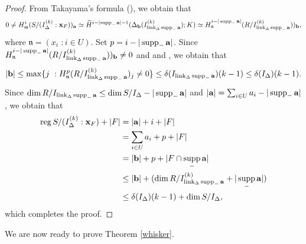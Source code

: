 \documentclass[12pt]{amsart}
\theoremstyle{definition}
\theoremstyle{remark}
\DeclareMathOperator{\link}{link}
\DeclareMathOperator{\supp}{supp}
\DeclareMathOperator{\reg}{reg}
\begin{document}
\begin{proof}
From Takayama's formula (\cite[Theorem 1]{t2005}), we obtain that 
$$0\neq H_{\mathfrak{m}}^{i}(S/(I_{\Delta}^{(k)}:{\bf x}_{F}))_{\bf a}\simeq\widetilde{H}^{i-|{\supp_{-}{\bf a}}|-1}(\Delta_{\bf b}(I_{\link_{\Delta}\supp_{-}{\bf a}}^{(k)});K)\simeq H_{\mathfrak{n}}^{i-|\supp_{-}{\bf a|}}(R/I_{\link_{\Delta}\supp_{-}{\bf a}}^{(k)}))_{\bf b},$$where $\mathfrak{n}=(x_{i}\,\,: i\in U)$. 
Set $p=i-|\supp_{-}{\bf a}|$. Since $H_{\mathfrak{n}}^{i-|\supp_{-}{\bf a|}}(R/I_{\link_{\Delta}\supp_{-}{\bf a}}^{(k)}))_{\bf b}\neq0$ and \cite[Lemma 2.1]{ht2023} and \cite[Theorem 2.2]{ht2023}, we obtain that $$|{\bf b}|\leq \max\{j\,\,:H_{\mathfrak{n}}^{p}(R/I_{\link_{\Delta}\supp_{-}{\bf a}}^{(k)})_{j}\neq0\}\leq\delta(I_{\link_{\Delta}\supp_{-}{\bf a}})(k-1)\leq\delta(I_{\Delta})(k-1).$$ 
Since $\dim R/I_{\link_{\Delta}\supp_{-}{\bf a}}\leq\dim S/I_{\Delta}-|\supp_{-}{\bf a}|$ and $|{\bf a}|=\sum_{i\in U}a_{i}-|\supp_{-}{\bf a}|$, we obtain that 
\begin{align*}
\reg S/(I_{\Delta}^{(k)}:{\bf x}_{F})+|F|&=|{\bf a}|+i+|F|\\
&=\sum_{i\in U}a_{i}+p+|F|\\
&=|{\bf b}|+p+|F\cap\supp_{-}{\bf a}|\\
&\leq |{\bf b}|+(\dim R/I_{\link_{\Delta}\supp_{-}{\bf a}}^{(k)}+|\supp_{-}{\bf a}|) \\
&\leq\delta(I_{\Delta})(k-1)+\dim S/I_{\Delta},
\end{align*}
which completes the proof. 
\end{proof}

We are now ready to prove Theorem \ref{whisker}. 
\end{document}
